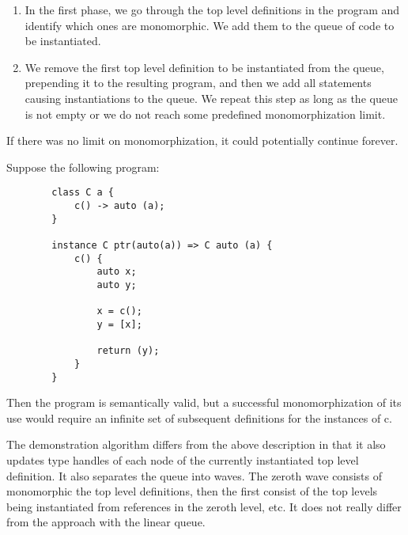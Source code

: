 \begin{enumerate}
    \item In the first phase, we go through the top level definitions in the program and identify which ones are monomorphic. We add them to the queue of code to be instantiated.

    \item We remove the first top level definition to be instantiated from the queue, prepending it to the resulting program, and then we add all statements causing instantiations to the queue. We repeat this step as long as the queue is not empty or we do not reach some predefined monomorphization limit.
\end{enumerate}


If there was no limit on monomorphization, it could potentially continue forever.

\begin{ex}
    Suppose the following program:

    \begin{lstlisting}
        class C a {
            c() -> auto (a);
        }

        instance C ptr(auto(a)) => C auto (a) {
            c() {
                auto x;
                auto y;

                x = c();
                y = [x];

                return (y);
            }
        }
    \end{lstlisting}

    Then the program is semantically valid, but a successful monomorphization of its use would require an infinite set of subsequent definitions for the instances of c.


\end{ex}

The demonstration algorithm differs from the above description in that it also updates type handles  of each node of the currently instantiated top level definition. It also separates the queue into waves. The zeroth wave consists of monomorphic the top level definitions, then the first consist of the top levels being instantiated from references in the zeroth level, etc. It does not really differ from the approach with the linear queue. 

